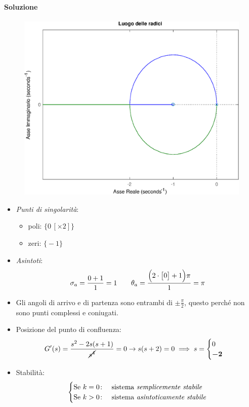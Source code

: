 \paragraph{Soluzione}

\begin{figure}[ht]
	\centering
	\includegraphics[scale=.6]{mod1/assets/rl_ex32}
\end{figure}

\begin{itemize}
	\item \emph{Punti di singolarità}:
		\begin{itemize}
			\item poli: \(\bigl\{ 0\,[\times 2] \bigr\}\)
			\item zeri: \(\bigl\{ -1 \bigr\}\)
		\end{itemize}
	\item \emph{Asintoti}:
		\[
			\sigma_a = \frac{0+1}{1} = 1 \qquad
			\theta_a = \frac{\Bigl(2\cdot\bigl[0\bigr]+1\Bigr)\pi}{1} = \pi
		\]
	\item Gli angoli di arrivo e di partenza sono entrambi di
		\(\pm \frac{\pi}{2}\), questo perché non sono punti complessi e
		coniugati.
	\item Posizione del punto di confluenza:
		\[
			G^\prime(s) = \frac{s^2 -2s(s+1)}{\cancel{s^4}} = 0
			\rightarrow s(s+2) = 0
			\implies s= \begin{cases} 0 \\ \bm{-2} \end{cases}
		\]
	\item Stabilità:
		\[\begin{cases}
			\text{Se } k = 0\colon & \text{sistema \emph{semplicemente stabile}} \\
			\text{Se } k > 0\colon & \text{sistema \emph{asintoticamente stabile}}
		\end{cases}\]
\end{itemize}


